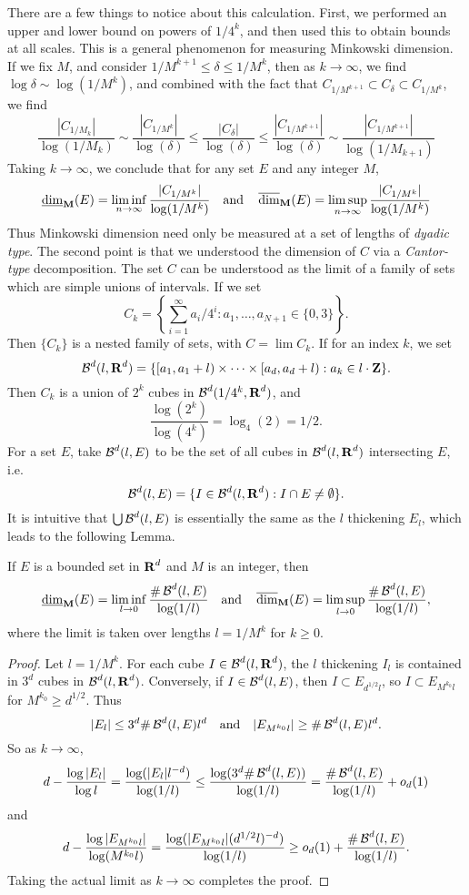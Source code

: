 There are a few things to notice about this calculation. First, we performed an upper and lower bound on powers of $1/4^k$, and then used this to obtain bounds at all scales. This is a general phenomenon for measuring Minkowski dimension. If we fix $M$, and consider $1/M^{k+1} \leq \delta \leq 1/M^k$, then as $k \to \infty$, we find $\log \delta \sim \log(1/M^k)$, and combined with the fact that $C_{1/M^{k+1}} \subset C_\delta \subset C_{1/M^k}$, we find
%
\[ \frac{|C_{1/M_k}|}{\log(1/M_k)} \sim \frac{|C_{1/M^k}|}{\log(\delta)} \leq \frac{|C_\delta|}{\log(\delta)} \leq \frac{|C_{1/M^{k+1}}|}{\log(\delta)} \sim \frac{|C_{1/M^{k+1}}|}{\log(1/M_{k+1})} \]
%
Taking $k \to \infty$, we conclude that for any set $E$ and any integer $M$,
%
\[ \operatorname{\underline{\dim}_{\mathbf{M}}}(E) = \liminf_{n \to \infty} \frac{|C_{1/M^k}|}{\log(1/M^k)}\quad\text{and}\quad \operatorname{\overline{\dim}_{\mathbf{M}}}(E) = \limsup_{n \to \infty} \frac{|C_{1/M^k}|}{\log(1/M^k)} \]
%
Thus Minkowski dimension need only be measured at a set of lengths of {\it dyadic type}. The second point is that we understood the dimension of $C$ via a {\it Cantor-type} decomposition. The set $C$ can be understood as the limit of a family of sets which are simple unions of intervals. If we set
%
\[ C_k = \left\{ \sum_{i = 1}^\infty a_i/4^i : a_1, \dots, a_{N+1} \in \{ 0, 3 \} \right\}. \]
%
Then $\{ C_k \}$ is a nested family of sets, with $C = \lim C_k$. If for an index $k$, we set
%
\[ \operatorname{\mathcal{B}}^d(l,\operatorname{\mathbf{R}}^d) = \{ [a_1, a_1 + l) \times \cdots \times [a_d, a_d + l) : a_k \in l \cdot \operatorname{\mathbf{Z}} \}. \]
%
Then $C_k$ is a union of $2^k$ cubes in $\operatorname{\mathcal{B}}^d(1/4^k,\operatorname{\mathbf{R}}^d)$, and
%
\[ \frac{\log(2^k)}{\log(4^k)} = \log_4(2) = 1/2. \]
%
For a set $E$, take $\operatorname{\mathcal{B}}^d(l,E)$ to be the set of all cubes in $\operatorname{\mathcal{B}}^d(l,\operatorname{\mathbf{R}}^d)$ intersecting $E$, i.e.
%
\[ \operatorname{\mathcal{B}}^d(l,E) = \{ I \in \operatorname{\mathcal{B}}^d(l,\operatorname{\mathbf{R}}^d): I \cap E \neq \emptyset \}. \]
%
It is intuitive that $\bigcup \operatorname{\mathcal{B}}^d(l,E)$ is essentially the same as the $l$ thickening $E_l$, which leads to the following Lemma.

\begin{lemma}
	If $E$ is a bounded set in $\operatorname{\mathbf{R}}^d$ and $M$ is an integer, then
	\[ \operatorname{\underline{\dim}_{\mathbf{M}}}(E) = \liminf_{l \to 0} \frac{\# \operatorname{\mathcal{B}}^d(l,E)}{\log(1/l)}\quad\text{and}\quad \operatorname{\overline{\dim}_{\mathbf{M}}}(E) = \limsup_{l \to 0} \frac{\# \operatorname{\mathcal{B}}^d(l,E)}{\log(1/l)}, \]
	where the limit is taken over lengths $l = 1/M^k$ for $k \geq 0$.
\end{lemma}
\begin{proof}
	Let $l = 1/M^k$. For each cube $I \in \operatorname{\mathcal{B}}^d(l,\operatorname{\mathbf{R}}^d)$, the $l$ thickening $I_l$ is contained in $3^d$ cubes in $\operatorname{\mathcal{B}}^d(l,\operatorname{\mathbf{R}}^d)$. Conversely, if $I \in \operatorname{\mathcal{B}}^d(l,E)$, then $I \subset E_{d^{1/2} l}$, so $I \subset E_{M^{k_0} l}$ for $M^{k_0} \geq d^{1/2}$. Thus
	\[ |E_l| \leq 3^d \# \operatorname{\mathcal{B}}^d(l,E) l^d\quad\text{and}\quad|E_{M^{k_0} l}| \geq \# \operatorname{\mathcal{B}}^d(l,E) l^d. \]
	So as $k \to \infty$,
	\[ d - \frac{\log |E_l|}{\log l} = \frac{\log(|E_l| l^{-d})}{\log(1/l)} \leq \frac{\log(3^d \# \operatorname{\mathcal{B}}^d(l,E))}{\log(1/l)} = \frac{\# \operatorname{\mathcal{B}}^d(l,E)}{\log(1/l)} + o_d(1) \]
	and
	\[ d - \frac{\log|E_{M^{k_0} l} |}{\log(M^{k_0} l)} = \frac{\log(|E_{M^{k_0} l}| (d^{1/2} l)^{-d})}{\log(1/l)} \geq o_d(1) + \frac{\# \operatorname{\mathcal{B}}^d(l,E)}{\log(1/l)}. \]
	Taking the actual limit as $k \to \infty$ completes the proof.
\end{proof}

